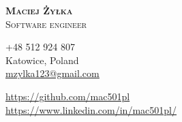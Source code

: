 \documentclass[A4,11pt]{article}
\begin{document}
\textbf{\Huge \scshape{Maciej Żyłka}} \\ 
{\Large \scshape{Software engineer}} \\ \vspace{5pt} 
\begin{minipage}[c]{0.4\textwidth}
    \faPhone \tab +48 512 924 807\\
    \faMapMarker \tab Katowice, Poland\\
    \faEnvelopeO \tab \href{mailto:mzylka123@gmail.com}{\underline{mzylka123@gmail.com}}\\
\end{minipage}
\begin{minipage}[c]{0.4\textwidth}
    \faGithub \tab \href{https://github.com/mac501pl}{\underline{https://github.com/mac501pl}} \\
    \faLinkedinSquare \tab \href{https://www.linkedin.com/in/mac501pl/}{\underline{https://www.linkedin.com/in/mac501pl/}} \\
\end{minipage}
\end{document}
